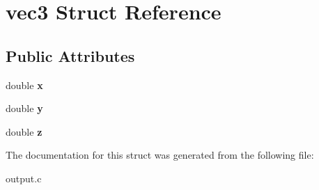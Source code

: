 \hypertarget{structvec3}{
\section{vec3 Struct Reference}
\label{structvec3}
}
\subsection*{Public Attributes}
\begin{DoxyCompactItemize}
\item 
\hypertarget{structvec3_ae25ebf32c019afc408f51f6117558365}{
double {\bfseries x}}
\label{structvec3_ae25ebf32c019afc408f51f6117558365}

\item 
\hypertarget{structvec3_a9c3ca9a994470ce9bc9fee5963439fba}{
double {\bfseries y}}
\label{structvec3_a9c3ca9a994470ce9bc9fee5963439fba}

\item 
\hypertarget{structvec3_a2b02670cfe437ee01416916bac917584}{
double {\bfseries z}}
\label{structvec3_a2b02670cfe437ee01416916bac917584}

\end{DoxyCompactItemize}


The documentation for this struct was generated from the following file:\begin{DoxyCompactItemize}
\item 
output.c\end{DoxyCompactItemize}
